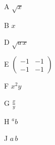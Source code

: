 \documentclass{article}
\begin{document}
A $\sqrt{x}$

B $x$

D $\sqrt{a\,x}$

E $\begin{pmatrix}{-}1 & -1\\ -1 & {-}1\end{pmatrix}$

F $x^{2}y$

G $\frac{x}{y}$

H ${}^{a}b$

J $a\,b$
\end{document}
